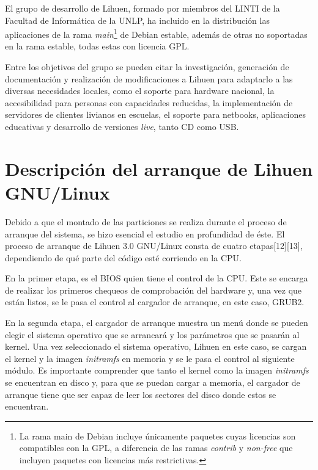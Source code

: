 \documentclass[final,narroweqnarray,inline,twoside]{ieee}
\newcommand{\itref}[1]{[{#1}]}
\begin{document}
El grupo de desarrollo de Lihuen, formado por miembros del LINTI de la Facultad de Informática de la UNLP, ha incluido en la distribución las aplicaciones de la rama \textit{main}\footnote{La rama main de Debian incluye únicamente paquetes cuyas licencias son compatibles con la GPL, a diferencia de las ramas \textit{contrib} y \textit{non-free} que incluyen paquetes con licencias más restrictivas.} de Debian estable, además de otras no soportadas en la rama estable, todas estas con licencia GPL. 

Entre los objetivos del grupo se pueden citar la investigación, generación de documentación y realización de modificaciones a Lihuen para adaptarlo a las diversas necesidades locales, como el soporte para hardware nacional, la accesibilidad para personas con capacidades reducidas, la implementación de servidores de clientes livianos en escuelas, el soporte para netbooks, aplicaciones educativas y desarrollo de versiones \textit{live}, tanto CD como USB.

\section{Descripción del arranque de Lihuen GNU/Linux}
Debido a que el montado de las particiones se realiza durante el proceso de arranque del sistema, se hizo esencial el estudio en profundidad de éste. El proceso de arranque de Lihuen 3.0 GNU/Linux consta de cuatro etapas\itref{12}\itref{13}, dependiendo de qué parte del código esté corriendo en la CPU. 

En la primer etapa, es el BIOS quien tiene el control de la CPU. Este se encarga de realizar los primeros chequeos de comprobación del hardware y, una vez que están listos, se le pasa el control al cargador de arranque, en este caso, GRUB2.

En la segunda etapa, el cargador de arranque muestra un menú donde se pueden elegir el sistema operativo que se arrancará y los parámetros que se pasarán al kernel. Una vez seleccionado el sistema operativo, Lihuen en este caso, se cargan el kernel y la imagen \textit{initramfs} en memoria y se le pasa el control al siguiente módulo. Es importante comprender que tanto el kernel como la imagen \textit{initramfs} se encuentran en disco y, para que se puedan cargar a memoria, el cargador de arranque tiene que ser capaz de leer los sectores del disco donde estos se encuentran.
\end{document}

